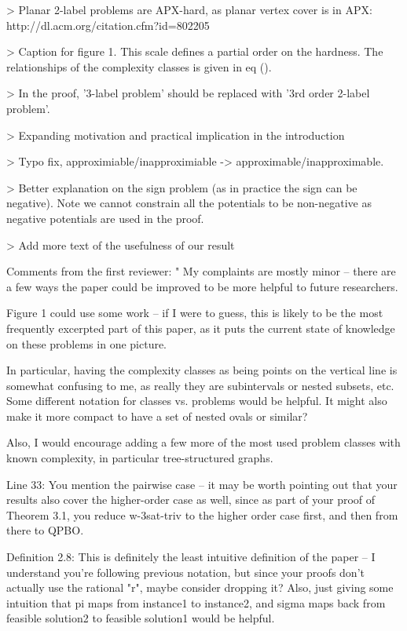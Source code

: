 > Planar 2-label problems are APX-hard,
as planar vertex cover is in APX:
http://dl.acm.org/citation.cfm?id=802205

> Caption for figure 1. This scale defines a partial order on the hardness. The relationships of the complexity classes is given in eq ().

> In the proof, '3-label problem' should be replaced with '3rd order 2-label problem'.

> Expanding motivation and practical implication in the introduction

> Typo fix, approximiable/inapproximiable -> approximable/inapproximable.

> Better explanation on the sign problem (as in practice the sign can be negative). Note we cannot constrain all the potentials to be non-negative as negative potentials are used in the proof.

> Add more text of the usefulness of our result

Comments from the first reviewer:
"
My complaints are mostly minor -- there are a few ways the paper could be improved to be more helpful to future researchers.

Figure 1 could use some work -- if I were to guess, this is likely to be the most frequently excerpted part of this paper, as it puts the current state of knowledge on these problems in one picture.

In particular, having the complexity classes as being points on the vertical line is somewhat confusing to me, as really they are subintervals or nested subsets, etc. Some different notation for classes vs. problems would be helpful. It might also make it more compact to have a set of nested ovals or similar? 

Also, I would encourage adding a few more of the most used problem classes with known complexity, in particular tree-structured graphs.

Line 33: You mention the pairwise case -- it may be worth pointing out that your results also cover the higher-order case as well, since as part of your proof of Theorem 3.1, you reduce w-3sat-triv to the higher order case first, and then from there to QPBO.

Definition 2.8: This is definitely the least intuitive definition of the paper -- I understand you're following previous notation, but since your proofs don't actually use the rational "r", maybe consider dropping it? Also, just giving some intuition that pi maps from instance1 to instance2, and sigma maps back from feasible solution2 to feasible solution1 would be helpful.

